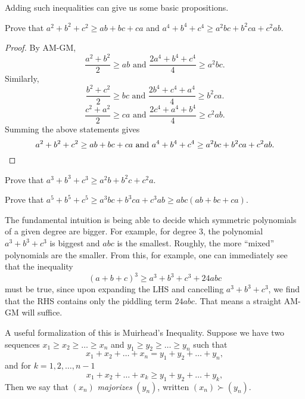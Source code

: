 \documentclass[11pt]{scrartcl}
\begin{document}
Adding such inequalities can give us some basic propositions.
\begin{example}
  Prove that $a^2+b^2+c^2 \ge ab+bc+ca$ and $a^4+b^4+c^4 \ge a^2bc+b^2ca+c^2ab$.
\end{example}
\begin{proof}
  By AM-GM,
  \[ \frac{a^2+b^2}{2} \ge ab \text{ and } \frac{2a^4+b^4+c^4}{4} \ge a^2bc. \]
  Similarly,
  \[ \frac{b^2+c^2}{2} \ge bc \text{ and } \frac{2b^4+c^4+a^4}{4} \ge b^2ca. \]
  \[ \frac{c^2+a^2}{2} \ge ca \text{ and } \frac{2c^4+a^4+b^4}{4} \ge c^2ab. \]
  Summing the above statements gives
  \[ a^2+b^2+c^2 \ge ab+bc+ca \text{ and } a^4+b^4+c^4 \ge a^2bc+b^2ca+c^2ab. \qedhere \]
\end{proof}
\begin{exercise}
  Prove that $a^3+b^3+c^3 \ge a^2b+b^2c+c^2a$.
\end{exercise}
\begin{exercise}
  Prove that $a^5+b^5+c^5 \ge a^3bc + b^3ca + c^3ab \ge abc(ab+bc+ca)$.
\end{exercise}
The fundamental intuition is being able to decide which symmetric polynomials of a given degree are bigger.
For example, for degree $3$, the polynomial $a^3+b^3+c^3$ is biggest and $abc$ is the smallest.
Roughly, the more ``mixed'' polynomials are the smaller.
From this, for example, one can immediately see that the inequality
\[ (a+b+c)^3 \ge a^3+b^3+c^3+24abc \]
must be true, since upon expanding the LHS and cancelling $a^3+b^3+c^3$,
we find that the RHS contains only the piddling term $24abc$.
That means a straight AM-GM will suffice.

A useful formalization of this is Muirhead's Inequality.
Suppose we have two sequences $x_1 \ge x_2 \ge \dots \ge x_n$ and $y_1 \ge y_2 \ge \dots \ge y_n$ such that
\[ x_1 + x_2 + \dots + x_n = y_1 + y_2 + \dots + y_n, \]
and for $k=1,2,\dots,n-1$
\[ x_1 + x_2 + \dots + x_k \ge y_1 + y_2 + \dots + y_k, \]
Then we say that $(x_n)$ \emph{majorizes} $(y_n)$, written $(x_n) \succ (y_n)$.
\end{document}
